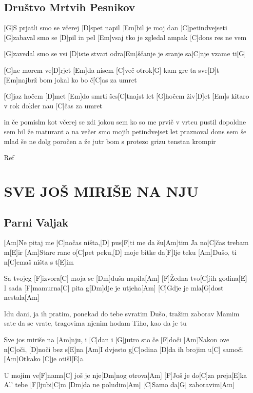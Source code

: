 \documentclass{article}
\begin{document}
\subsection*{Društvo Mrtvih Pesnikov}
\begin{guitar}

	[G]S prjatli smo se včerej [D]spet napil
	[Em]bil je moj dan [C]petindvejseti
	[G]zabaval smo se [D]pil in pel
	[Em]vsaj tko je zgledal ampak [C]dons res ne vem
	\linebreak

	[G]zavedal smo se vsi [D]iste stvari
	odra[Em]ščanje je sranje sa[C]nje vzame ti[G]
	\linebreak

	[G]ne morem ve[D]rjet
	[Em]da nisem [C]več otrok[G]
	kam gre ta sve[D]t
	[Em]najbrž bom jokal ko bo č[C]as za umret
	\linebreak

	[G]jaz hočem [D]met
	[Em]do smrti šes[C]tnajst let
	[G]hočem živ[D]et
	[Em]s kitaro v rok dokler nau [C]čas za umret
	\linebreak

	in če pomislm kot včerej se zdi
	jokou sem ko so me prvič v vrtcu pustil
	dopoldne sem bil že maturant
	a na večer smo mojih petindvejset let praznoval
	dons sem še mlad še ne dolg poročen
	a že jutr bom s protezo grizu tenstan krompir
	\linebreak
		
	Ref

\end{guitar}


\section*{SVE JOŠ MIRIŠE NA NJU}
%
\subsection*{Parni Valjak}
\begin{guitar}
	

	[Am]Ne pitaj me [C]nočas ništa,[D] pus[F]ti me da šu[Am]tim
	Ja no[C]čas trebam m[E]ir
	[Am]Stare rane o[C]pet peku,[D] moje bitke da[F]lje teku
	[Am]Dušo, ti n[C]emaš ništa s t[E]im

	Sa tvojeg [F]izvora[C] moja se [Dm]duša napila[Am]
	[F]Žedna tvo[C]jih godina[E]
	I sada [F]mamurna[C] pita g[Dm]dje je utjeha[Am]
	[C]Gdje je mla[G]dost nestala[Am]

	Idu dani, ja ih pratim, ponekad do tebe svratim
	Dušo, tražim zaborav
	Mamim sate da se vrate, tragovima njenim hodam
	Tiho, kao da je tu

	Sve jos miriše na [Am]nju, i [C]dan i [G]jutro sto če [F]doči
	[Am]Nakon ove n[C]oči, [D]noči bez s[E]na
	[Am]I dvjesto g[C]odina [D]da ih brojim u[C] samoči
	[Am]Otkako [C]je otišl[E]a

	U mojim ve[F]nama[C] još je nje[Dm]nog otrova[Am]
	[F]Još je do[C]za preja[E]ka
	Al' tebe [F]ljubi[C]m [Dm]da ne poludim[Am]
	[C]Samo da[G] zaboravim[Am]


\end{guitar}
\end{document}

